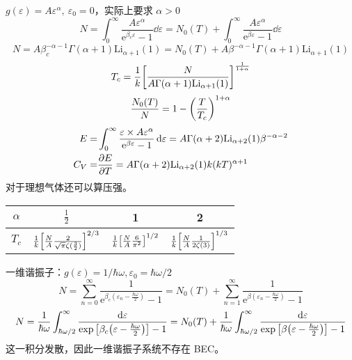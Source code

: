 \begin{framed}
    $g(\varepsilon) = A \varepsilon^{\alpha},\ \varepsilon_0 = 0$，实际上要求 $\alpha > 0$ \[
        N = \int_0^{\infty} \frac{A \varepsilon^{\alpha}}{\mathrm{e}^{\beta_c \varepsilon} - 1} \dd{\varepsilon} = N_0(T) + \int_0^{\infty} \frac{A \varepsilon^{\alpha}}{\mathrm{e}^{\beta \varepsilon} - 1} \dd{\varepsilon}
    \] \[
        N = A \beta_c ^{-\alpha -1} \Gamma (\alpha +1) \text{Li}_{\alpha +1}(1) = N_0(T) + A \beta ^{-\alpha -1} \Gamma (\alpha +1) \text{Li}_{\alpha +1}(1)
    \] \[
        T_c = \frac{1}{k} \qty[\frac{N}{A \Gamma (\alpha +1) \text{Li}_{\alpha +1}(1)}]^{\frac{1}{1 + \alpha}}
    \]  \[
        \frac{N_0(T)}{N} = 1 - \qty(\frac{T}{T_c})^{1 + \alpha}
    \] \begin{align*}
        E =   & \int_0^{\infty} \frac{\varepsilon \times A \varepsilon^{\alpha}}{\mathrm{e}^{\beta \varepsilon} - 1} \dd{\varepsilon} = A \Gamma (\alpha +2) \text{Li}_{\alpha +2}(1) \beta ^{-\alpha -2} \\
        C_V = & \pdv{E}{T} = A \Gamma (\alpha +2) \text{Li}_{\alpha +2}(1) k (k T)^{\alpha + 1}
    \end{align*} 对于理想气体还可以算压强。
\end{framed}

\begin{table}[H]
    \centering
    \begin{tabular}{|c|c|c|c|}
        \hline
        $\alpha$ & $\frac{1}{2}$                                                                 & 1                                                     & 2                                                           \\
        \hline
        $T_c$    & $\frac{1}{k} \qty[\frac{N}{A} \frac{2}{\sqrt{\pi} \zeta(\frac{3}{2})}]^{2/3}$ & $\frac{1}{k} \qty[\frac{N}{A} \frac{6}{\pi^2}]^{1/2}$ & $\frac{1}{k} \qty[\frac{N}{A} \frac{1}{2 \zeta (3)}]^{1/3}$ \\
        \hline
    \end{tabular}
\end{table}

\begin{framed}
    一维谐振子：$g(\varepsilon) = 1 / \hbar \omega, \varepsilon_0 = \hbar \omega / 2$
    \[
        N = \sum_{n = 0}^{\infty} \frac{1}{\mathrm{e}^{\beta_c (\varepsilon_n - \frac{\hbar \omega}{2})} - 1} = N_0(T) + \sum_{n = 1}^{\infty} \frac{1}{\mathrm{e}^{\beta (\varepsilon_n - \frac{\hbar \omega}{2})} - 1}
    \]
    \[
        N = \frac{1}{\hbar \omega} \int_{\hbar \omega / 2}^{\infty} \frac{\dd{\varepsilon}}{\exp \qty[\beta_c \qty(\varepsilon - \frac{\hbar \omega}{2})] - 1} = N_0(T) + \frac{1}{\hbar \omega} \int_{\hbar \omega / 2}^{\infty} \frac{\dd{\varepsilon}}{\exp \qty[\beta \qty(\varepsilon - \frac{\hbar \omega}{2})] - 1}
    \] 这一积分发散，因此一维谐振子系统不存在 BEC。
\end{framed}

